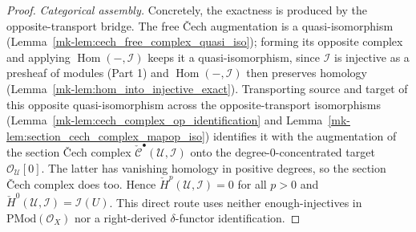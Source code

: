 \begin{proof}
  \emph{Categorical assembly.} Concretely, the exactness is produced by the
  opposite-transport bridge. The free {\v C}ech augmentation is a quasi-isomorphism
  (Lemma~\ref{mk-lem:cech_free_complex_quasi_iso}); forming its opposite complex and
  applying \(\operatorname{Hom}(-, \mathcal{I})\) keeps it a quasi-isomorphism, since
  \(\mathcal{I}\) is injective as a presheaf of modules (Part 1) and
  \(\operatorname{Hom}(-, \mathcal{I})\) then preserves homology
  (Lemma~\ref{mk-lem:hom_into_injective_exact}). Transporting source and target of this
  opposite quasi-isomorphism across the opposite-transport isomorphisms
  (Lemma~\ref{mk-lem:cech_complex_op_identification} and
  Lemma~\ref{mk-lem:section_cech_complex_mapop_iso}) identifies it with the augmentation
  of the section {\v C}ech complex \(\check{\mathcal{C}}^\bullet(\mathcal{U},
  \mathcal{I})\) onto the degree-\(0\)-concentrated target \(\mathcal{O}_{\mathcal{U}}[0]\).
  The latter has vanishing homology in positive degrees, so the section {\v C}ech complex
  does too. Hence \(\check{H}^p(\mathcal{U}, \mathcal{I}) = 0\) for all \(p > 0\) and
  \(\check{H}^0(\mathcal{U}, \mathcal{I}) = \mathcal{I}(U)\). This direct route uses
  neither enough-injectives in \(\mathrm{PMod}(\mathcal{O}_X)\) nor a right-derived
  \(\delta\)-functor identification.
\end{proof}

